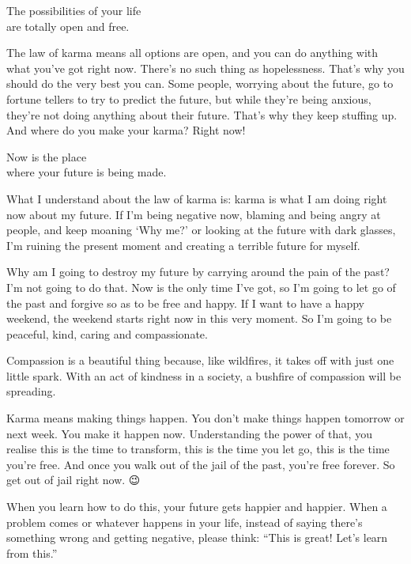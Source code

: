 \documentclass[12pt, openany]{book}
\newenvironment{aphorism}%
{%
\begin{center}\begin{itshape}
}%
{\end{itshape}\end{center}
}%
\begin{document}
\begin{aphorism}
The possibilities of your life\\  
are totally open and free.
\end{aphorism}

The law of karma means all options are open, and you can do anything with what you’ve got right now. There’s no such thing as hopelessness. That’s why you should do the very best you can. Some people, worrying about the future, go to fortune tellers to try to predict the future, but while they’re being anxious, they’re not doing anything about their future. That’s why they keep stuffing up. And where do you make your karma? Right now! 

\begin{aphorism}
Now is the place\\  
where your future is being made.
\end{aphorism}

What I understand about the law of karma is: karma is what I am doing right now about my future. If I’m being negative now, blaming and being angry at people, and keep moaning ‘Why me?’ or looking at the future with dark glasses, I’m ruining the present moment and creating a terrible future for myself. 

Why am I going to destroy my future by carrying around the pain of the past? I’m not going to do that. Now is the only time I’ve got, so I’m going to let go of the past and forgive so as to be free and happy. If I want to have a happy weekend, the weekend starts right now in this very moment. So I’m going to be peaceful, kind, caring and compassionate. 

Compassion is a beautiful thing because, like wildfires, it takes off with just one little spark. With an act of kindness in a society, a bushfire of compassion will be spreading. 

Karma means making things happen. You don’t make things happen tomorrow or next week. You make it happen now. Understanding the power of that, you realise this is the time to transform, this is the time you let go, this is the time you’re free. And once you walk out of the jail of the past, you’re free forever. So get out of jail right now. 😉

When you learn how to do this, your future gets happier and happier. When a problem comes or whatever happens in your life, instead of saying there’s something wrong and getting negative, please think: “This is great! Let’s learn from this.” 
\end{document}
